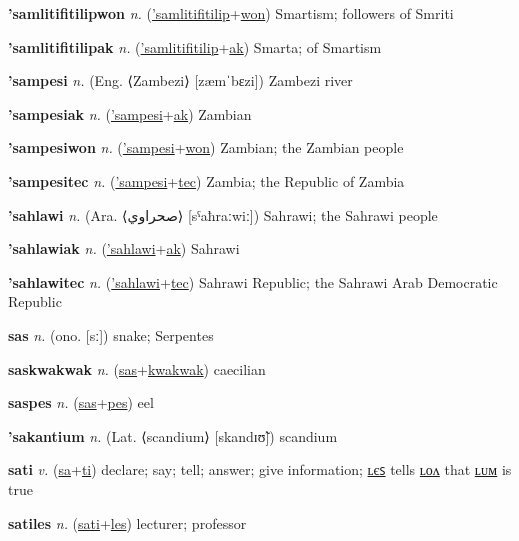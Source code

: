 \textbf{\hypertarget{'samlitifitilipwon}{'samlitifitilipwon}} \textit{n.} (\hyperlink{'samlitifitilip}{'samlitifitilip}+\allowbreak \hyperlink{won}{won})
Smartism; followers of Smriti

\textbf{\hypertarget{'samlitifitilipak}{'samlitifitilipak}} \textit{n.} (\hyperlink{'samlitifitilip}{'samlitifitilip}+\allowbreak \hyperlink{ak}{ak})
Smarta; of Smartism

\textbf{\hypertarget{'sampesi}{'sampesi}} \textit{n.} (Eng. ⟨Zambezi⟩ [zæmˈbɛzi])
Zambezi river

\textbf{\hypertarget{'sampesiak}{'sampesiak}} \textit{n.} (\hyperlink{'sampesi}{'sampesi}+\allowbreak \hyperlink{ak}{ak})
Zambian

\textbf{\hypertarget{'sampesiwon}{'sampesiwon}} \textit{n.} (\hyperlink{'sampesi}{'sampesi}+\allowbreak \hyperlink{won}{won})
Zambian; the Zambian people

\textbf{\hypertarget{'sampesitec}{'sampesitec}} \textit{n.} (\hyperlink{'sampesi}{'sampesi}+\allowbreak \hyperlink{tec}{tec})
Zambia; the Republic of Zambia

\textbf{\hypertarget{'sahlawi}{'sahlawi}} \textit{n.} (Ara. ⟨{\arabics{}صحراوي}⟩ [sˤaħraːwiː])
Sahrawi; the Sahrawi people

\textbf{\hypertarget{'sahlawiak}{'sahlawiak}} \textit{n.} (\hyperlink{'sahlawi}{'sahlawi}+\allowbreak \hyperlink{ak}{ak})
Sahrawi

\textbf{\hypertarget{'sahlawitec}{'sahlawitec}} \textit{n.} (\hyperlink{'sahlawi}{'sahlawi}+\allowbreak \hyperlink{tec}{tec})
Sahrawi Republic; the Sahrawi Arab Democratic Republic

\textbf{\hypertarget{sas}{sas}} \textit{n.} (ono. [sː])
snake; Serpentes

\textbf{\hypertarget{saskwakwak}{saskwakwak}} \textit{n.} (\hyperlink{sas}{sas}+\allowbreak \hyperlink{kwakwak}{kwakwak})
caecilian

\textbf{\hypertarget{saspes}{saspes}} \textit{n.} (\hyperlink{sas}{sas}+\allowbreak \hyperlink{pes}{pes})
eel

\textbf{\hypertarget{'sakantium}{'sakantium}} \textit{n.} (Lat. ⟨scandium⟩ [skandɪʊ̃])
scandium

\textbf{\hypertarget{sati}{sati}} \textit{v.} (\hyperlink{sa}{sa}+\allowbreak \hyperlink{ti}{ti})
declare; say; tell; answer; give information; \hyperlink{satiles}{ʟєꜱ} tells \hyperlink{satilon}{ʟᴏᴧ} that \hyperlink{satilum}{ʟᴜᴍ} is true

\textbf{\hypertarget{satiles}{satiles}} \textit{n.} (\hyperlink{sati}{sati}+\allowbreak \hyperlink{les}{les})
lecturer; professor

